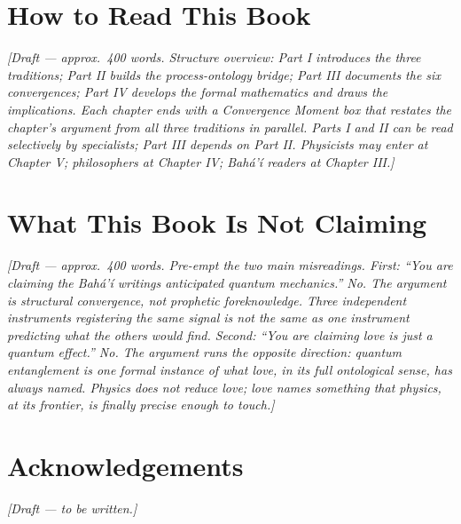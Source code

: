 \bigskip

\section*{How to Read This Book}

\noindent\textit{[Draft --- approx.\ 400 words. Structure overview: Part I
introduces the three traditions; Part II builds the process-ontology bridge;
Part III documents the six convergences; Part IV develops the formal
mathematics and draws the implications. Each chapter ends with a Convergence
Moment box that restates the chapter's argument from all three traditions in
parallel. Parts I and II can be read selectively by specialists; Part III
depends on Part II. Physicists may enter at Chapter V; philosophers at
Chapter IV; Bahá'í readers at Chapter III.]}

\bigskip

\section*{What This Book Is Not Claiming}

\noindent\textit{[Draft --- approx.\ 400 words. Pre-empt the two main
misreadings. First: ``You are claiming the Bahá'í writings anticipated
quantum mechanics.'' No. The argument is structural convergence, not
prophetic foreknowledge. Three independent instruments registering the same
signal is not the same as one instrument predicting what the others would
find. Second: ``You are claiming love is just a quantum effect.'' No. The
argument runs the opposite direction: quantum entanglement is one formal
instance of what love, in its full ontological sense, has always named.
Physics does not reduce love; love names something that physics, at its
frontier, is finally precise enough to touch.]}

\bigskip

\section*{Acknowledgements}

\noindent\textit{[Draft --- to be written.]}

\vfill
